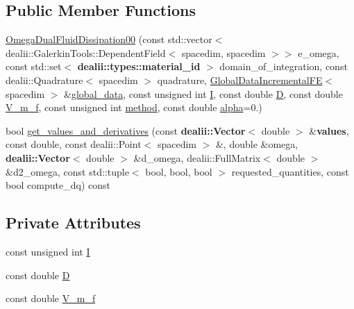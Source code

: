 \subsection*{Public Member Functions}
\begin{DoxyCompactItemize}
\item 
\hyperlink{classincremental_f_e_1_1_omega_dual_fluid_dissipation00_a7a0257beaaa9adbfd3d7eb69ff95c88e}{Omega\+Dual\+Fluid\+Dissipation00} (const std\+::vector$<$ dealii\+::\+Galerkin\+Tools\+::\+Dependent\+Field$<$ spacedim, spacedim $>$$>$ e\+\_\+omega, const std\+::set$<$ {\bf dealii\+::types\+::material\+\_\+id} $>$ domain\+\_\+of\+\_\+integration, const dealii\+::\+Quadrature$<$ spacedim $>$ quadrature, \hyperlink{classincremental_f_e_1_1_global_data_incremental_f_e}{Global\+Data\+Incremental\+FE}$<$ spacedim $>$ \&\hyperlink{classincremental_f_e_1_1_omega_3_01spacedim_00_01spacedim_01_4_afffe781a5a2032ec003032adc78e1bf3}{global\+\_\+data}, const unsigned int \hyperlink{classincremental_f_e_1_1_omega_dual_fluid_dissipation00_ac10745e41cfa5deeb5a006e5379809fe}{I}, const double \hyperlink{classincremental_f_e_1_1_omega_dual_fluid_dissipation00_a3ce80218311cfbcf3cbf790dea3f9efd}{D}, const double \hyperlink{classincremental_f_e_1_1_omega_dual_fluid_dissipation00_a638e5773adb265e3b39702fde3936188}{V\+\_\+m\+\_\+f}, const unsigned int \hyperlink{classincremental_f_e_1_1_omega_3_01spacedim_00_01spacedim_01_4_a6c95d57122261e8a2e26d3818251bc9b}{method}, const double \hyperlink{classincremental_f_e_1_1_omega_3_01spacedim_00_01spacedim_01_4_ad881c36804cc027c301f4f069756c2db}{alpha}=0.)
\item 
bool \hyperlink{classincremental_f_e_1_1_omega_dual_fluid_dissipation00_a505f97cabdd9375fe76b714c28088ca6}{get\+\_\+values\+\_\+and\+\_\+derivatives} (const {\bf dealii\+::\+Vector}$<$ double $>$ \&{\bf values}, const double, const dealii\+::\+Point$<$ spacedim $>$ \&, double \&omega, {\bf dealii\+::\+Vector}$<$ double $>$ \&d\+\_\+omega, dealii\+::\+Full\+Matrix$<$ double $>$ \&d2\+\_\+omega, const std\+::tuple$<$ bool, bool, bool $>$ requested\+\_\+quantities, const bool compute\+\_\+dq) const 
\end{DoxyCompactItemize}
\subsection*{Private Attributes}
\begin{DoxyCompactItemize}
\item 
const unsigned int \hyperlink{classincremental_f_e_1_1_omega_dual_fluid_dissipation00_ac10745e41cfa5deeb5a006e5379809fe}{I}
\item 
const double \hyperlink{classincremental_f_e_1_1_omega_dual_fluid_dissipation00_a3ce80218311cfbcf3cbf790dea3f9efd}{D}
\item 
const double \hyperlink{classincremental_f_e_1_1_omega_dual_fluid_dissipation00_a638e5773adb265e3b39702fde3936188}{V\+\_\+m\+\_\+f}
\end{DoxyCompactItemize}
